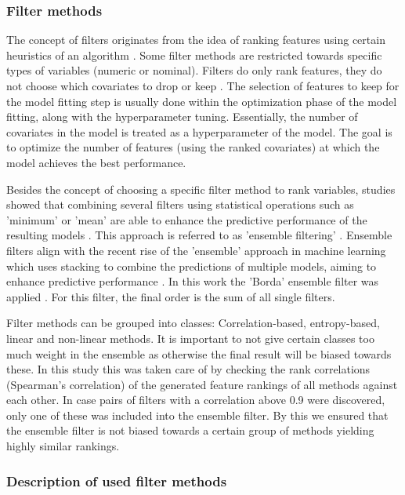 \documentclass[letterpaper, peerreview, draftcls]{IEEEtran}
\begin{document}
\subsubsection{Filter methods}

The concept of filters originates from the idea of ranking features using certain heuristics of an algorithm \cite{chandrashekar2014}.
Some filter methods are restricted towards specific types of variables (numeric or nominal).
Filters do only rank features, they do not choose which covariates to drop or keep \cite{drotar2015}.
The selection of features to keep for the model fitting step is usually done within the optimization phase of the model fitting, along with the hyperparameter tuning.
Essentially, the number of covariates in the model is treated as a hyperparameter of the model.
The goal is to optimize the number of features (using the ranked covariates) at which the model achieves the best performance.

Besides the concept of choosing a specific filter method to rank variables, studies showed that combining several filters using statistical operations such as 'minimum' or 'mean' are able to enhance the predictive performance of the resulting models \cite{abeel2010, drotar2017a}.
This approach is referred to as 'ensemble filtering' \cite{dietterich2000}.
Ensemble filters align with the recent rise of the 'ensemble' approach in machine learning which uses stacking to combine the predictions of multiple models, aiming to enhance predictive performance \cite{polikar2012, feurer2015, bolon-canedo2019}.
In this work the 'Borda' ensemble filter was applied \cite{drotar2017a}.
For this filter, the final order is the sum of all single filters.

Filter methods can be grouped into classes: Correlation-based, entropy-based, linear and non-linear methods.
It is important to not give certain classes too much weight in the ensemble as otherwise the final result will be biased towards these.
In this study this was taken care of by checking the rank correlations (Spearman's correlation) of the generated feature rankings of all methods against each other.
In case pairs of filters with a correlation above 0.9 were discovered, only one of these was included into the ensemble filter.
By this we ensured that the ensemble filter is not biased towards a certain group of methods yielding highly similar rankings.

\subsubsection{Description of used filter methods}
\end{document}
